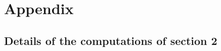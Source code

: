 \documentclass{article}
\begin{document}

\clearpage
\FloatBarrier
\printbibliography[
    heading=bibintoc,
    title={References}]

\clearpage
\FloatBarrier

\section*{Appendix}

\subsection*{Details of the computations of section 2}
\end{document}
